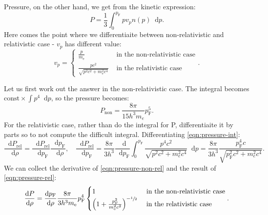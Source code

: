 \documentclass[]{article}
\newcommand{\dd}{\mathop{}\!\mathrm{d}}
\begin{document}
	Pressure, on the other hand, we get from the kinetic expression:
	\begin{equation}\label{eqn:pressure-int}
		P = \frac{1}{3} \int_0^{p_\mathrm{F}} p v_p n(p) \dd p.
	\end{equation}
	Here comes the point where we differentiaite between non-relativistic and relativistic case - $v_p$ has different value:
	\begin{equation}
		v_p = \begin{cases}
			\frac{p}{m_\mathrm{e}} & \text{ in the non-relativistic case} \\
			\frac{pc^2}{\sqrt{p^2c^2 + m_\mathrm{e}^2 c^4}} & \text{ in the relativistic case}
		\end{cases}.
	\end{equation}

	Let us first work out the answer in the non-relativistic case. The integral becomes $\text{const} \times \int p^4 \dd p$, so the pressure becomes:
	\begin{equation}\label{eqn:pressure-non-rel}
		P_\mathrm{non} = \frac{8 \pi}{15 h^3 m_e} p_\mathrm{F}^5.
	\end{equation}
	For the relativistic case, rather than do the integral for P, differentiaite it by parts so to not compute the difficult integral. Differentiating \eqref{eqn:pressure-int}:
	\begin{equation}\label{eqn:pressure-rel}
		\frac{\dd P_\mathrm{rel}}{\dd \rho} = \frac{\dd P_\mathrm{rel}}{\dd p_\mathrm{F}} \frac{\dd p_\mathrm{F}}{\dd \rho}, \quad \frac{\dd P_\mathrm{rel}}{\dd p_\mathrm{F}} = \frac{8\pi}{3h^3}\frac{\dd}{\dd p_\mathrm{F}}\int_0^{p_\mathrm{F}} \frac{p^4 c^2}{\sqrt{p^2c^2 + m_e^2 c^4}} \dd p = \frac{8\pi}{3h^3} \frac{p_\mathrm{F}^4 c}{\sqrt{p_\mathrm{F}^2c^2 + m_e^2 c^4}}.
	\end{equation}
	We can collect the derivative of \eqref{eqn:pressure-non-rel} and the result of \eqref{eqn:pressure-rel}:
	\begin{equation}\label{eqn:pressure-both}
		\frac{\dd P}{\dd \rho} = \frac{\dd p_\mathrm{F}}{\dd \rho}\frac{8 \pi}{3 h^3 m_\mathrm{e}} p_\mathrm{F}^4\begin{cases}
			1 & \text{ in the non-relativistic case} \\
			\left(1 + \frac{p_\mathrm{F}^2}{m_\mathrm{e}^2 c^2}\right)^{-\sfrac{1}{2}} & \text{ in the relativistic case}
		\end{cases}.
 	\end{equation}
\end{document}
